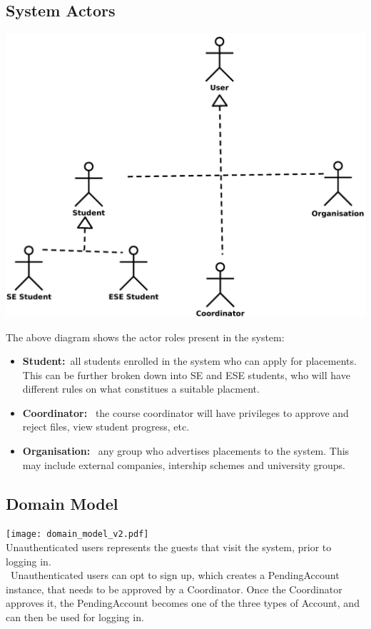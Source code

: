 \documentclass{l3deliverable}
\begin{document}
\subsection{System Actors}
\includegraphics[scale = 0.5]{actors.pdf}

The above diagram shows the actor roles present in the system:
\begin{itemize}
\item{\textbf{Student:}\ all students enrolled in the system who can apply for placements. This can be further broken down into SE and ESE students, who will have
different rules on what constitues a suitable placment.}
\item{\textbf{Coordinator: }\ the course coordinator will have privileges to approve and reject files, view student progress, etc.}
\item{\textbf{Organisation: }\ any group who advertises placements to the system. This may include external companies, intership schemes and university groups.}
\end{itemize}

\subsection{Domain Model}
\texttt{[image: domain\_model\_v2.pdf]}\\
Unauthenticated users represents the guests that visit the system, prior to logging in.\\\
Unauthenticated users can opt to sign up, which creates a PendingAccount instance, that needs to be approved by a Coordinator. Once the Coordinator approves it, the PendingAccount becomes one of the three types of Account, and can then be used for logging in.\\
\end{document}
